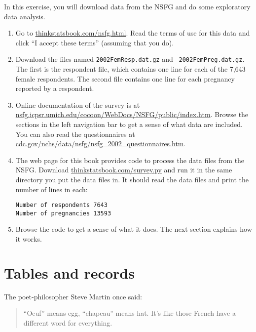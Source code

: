\documentclass[10pt]{book}
\begin{document}
\begin{ex}

In this exercise, you will download data from the NSFG and do some
exploratory data analysis.

\begin{enumerate}

\item Go to \url{thinkstatsbook.com/nsfg.html}.  Read the terms of
use for this data and click ``I accept these terms'' (assuming that you do).

\item Download the files named {\tt 2002FemResp.dat.gz} and {\tt
  2002FemPreg.dat.gz}.  The first is the respondent file, which contains
  one line for each of the 7,643 female respondents.
  The second file contains one line for each pregnancy reported by a
  respondent.

\item Online documentation of the survey is at
  \url{nsfg.icpsr.umich.edu/cocoon/WebDocs/NSFG/public/index.htm}.
  Browse the sections in the left navigation bar to get a sense of
  what data are included.  You can also read the questionnaires
  at \url{cdc.gov/nchs/data/nsfg/nsfg_2002_questionnaires.htm}.

\item The web page for this book provides code to process the data
  files from the NSFG.  Download \url{thinkstatsbook.com/survey.py}
  and run it in the same directory you put the data files in.  It
  should read the data files and print the number of lines in each:

\begin{verbatim}
Number of respondents 7643
Number of pregnancies 13593
\end{verbatim}

\item Browse the code to get a sense of what it does.  The next
section explains how it works.

\end{enumerate}

\end{ex}

\section{Tables and records}

The poet-philosopher Steve Martin once said:

\begin{quote}
``Oeuf'' means egg, ``chapeau'' means hat.  It's like those French
  have a different word for everything.
\end{quote}
\end{document}
